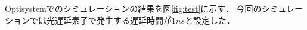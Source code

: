 Optisystemでのシミュレーションの結果を図\ref{fig:test}に示す．
今回のシミュレーションでは光遅延素子で発生する遅延時間が$1ns$と設定した．
\begin{figure}[t!]
\begin{center}
\end{center}
\end{figure}
